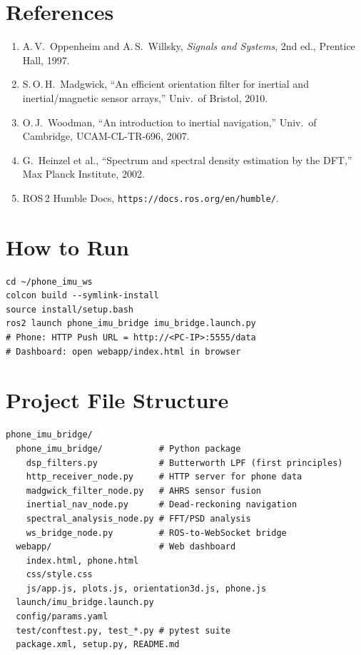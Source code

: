 \documentclass[12pt,a4paper]{article}
\begin{document}
\section*{References}
\begin{enumerate}
  \item[{[1]}] A.\,V.\ Oppenheim and A.\,S.\ Willsky, \textit{Signals and Systems}, 2nd ed., Prentice Hall, 1997.
  \item[{[2]}] S.\,O.\,H.\ Madgwick, ``An efficient orientation filter for inertial and inertial/magnetic sensor arrays,'' Univ.\ of Bristol, 2010.
  \item[{[3]}] O.\,J.\ Woodman, ``An introduction to inertial navigation,'' Univ.\ of Cambridge, UCAM-CL-TR-696, 2007.
  \item[{[4]}] G.\ Heinzel et al., ``Spectrum and spectral density estimation by the DFT,'' Max Planck Institute, 2002.
  \item[{[5]}] ROS\,2 Humble Docs, \texttt{https://docs.ros.org/en/humble/}.
\end{enumerate}

\appendix
\section{How to Run}
\begin{verbatim}
cd ~/phone_imu_ws
colcon build --symlink-install
source install/setup.bash
ros2 launch phone_imu_bridge imu_bridge.launch.py
# Phone: HTTP Push URL = http://<PC-IP>:5555/data
# Dashboard: open webapp/index.html in browser
\end{verbatim}

\section{Project File Structure}
\begin{verbatim}
phone_imu_bridge/
  phone_imu_bridge/           # Python package
    dsp_filters.py            # Butterworth LPF (first principles)
    http_receiver_node.py     # HTTP server for phone data
    madgwick_filter_node.py   # AHRS sensor fusion
    inertial_nav_node.py      # Dead-reckoning navigation
    spectral_analysis_node.py # FFT/PSD analysis
    ws_bridge_node.py         # ROS-to-WebSocket bridge
  webapp/                     # Web dashboard
    index.html, phone.html
    css/style.css
    js/app.js, plots.js, orientation3d.js, phone.js
  launch/imu_bridge.launch.py
  config/params.yaml
  test/conftest.py, test_*.py # pytest suite
  package.xml, setup.py, README.md
\end{verbatim}
\end{document}
